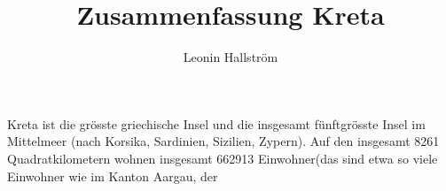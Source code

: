 \documentclass{article}
\begin{document}
\title{Zusammenfassung Kreta}
\author{Leonin Hallström}

\maketitle
Kreta ist die grösste griechische Insel und die insgesamt fünftgrösste Insel im Mittelmeer (nach Korsika, Sardinien, Sizilien, Zypern). Auf den insgesamt 8261 Quadratkilometern wohnen insgesamt 662913 Einwohner(das sind etwa so viele Einwohner wie im Kanton Aargau, der  
\end{document}
